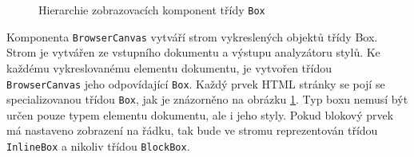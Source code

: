 \begin{figure}[H]
  \begin{center}
    \caption{Hierarchie zobrazovacích komponent třídy \texttt{Box}}
    \label{Figure.BoxHierarchy}
  \end{center}
\end{figure}

Komponenta \texttt{BrowserCanvas} vytváří strom vykreslených objektů třídy Box. Strom je vytvářen ze vstupního dokumentu a výstupu analyzátoru stylů. Ke každému vykreslovanému elementu dokumentu, je vytvořen třídou \texttt{BrowserCanvas} jeho odpovídající \texttt{Box}. Každý prvek HTML stránky se pojí se specializovanou třídou \texttt{Box}, jak je znázorněno na obrázku \ref{Figure.BoxHierarchy}. Typ boxu nemusí být určen pouze typem elementu dokumentu, ale i jeho styly. Pokud blokový prvek má nastaveno zobrazení na řádku, tak bude ve stromu reprezentován třídou \texttt{InlineBox} a nikoliv třídou \texttt{BlockBox}. 

